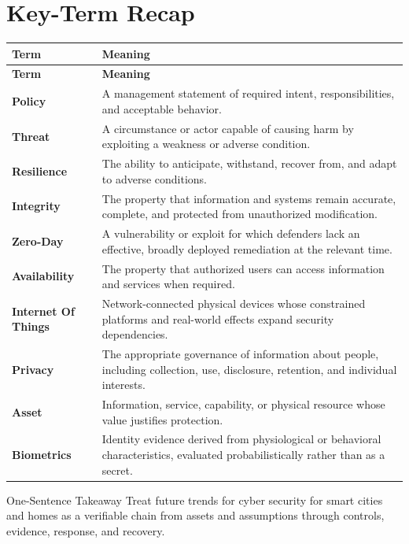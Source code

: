 \documentclass[11pt,letterpaper]{article}
\begin{document}
\section*{Key-Term Recap}
\begin{longtable}{>{\raggedright\arraybackslash}p{}>{\raggedright\arraybackslash}p{}}
\toprule\rowcolor{Navy}\color{white}\textbf{Term} & \color{white}\textbf{Meaning}\\\midrule
\endfirsthead
\toprule\rowcolor{Navy}\color{white}\textbf{Term} & \color{white}\textbf{Meaning}\\\midrule
\endhead
\textbf{Policy} & A management statement of required intent, responsibilities, and acceptable behavior. \\\midrule
\textbf{Threat} & A circumstance or actor capable of causing harm by exploiting a weakness or adverse condition. \\\midrule
\textbf{Resilience} & The ability to anticipate, withstand, recover from, and adapt to adverse conditions. \\\midrule
\textbf{Integrity} & The property that information and systems remain accurate, complete, and protected from unauthorized modification. \\\midrule
\textbf{Zero-Day} & A vulnerability or exploit for which defenders lack an effective, broadly deployed remediation at the relevant time. \\\midrule
\textbf{Availability} & The property that authorized users can access information and services when required. \\\midrule
\textbf{Internet Of Things} & Network-connected physical devices whose constrained platforms and real-world effects expand security dependencies. \\\midrule
\textbf{Privacy} & The appropriate governance of information about people, including collection, use, disclosure, retention, and individual interests. \\\midrule
\textbf{Asset} & Information, service, capability, or physical resource whose value justifies protection. \\\midrule
\textbf{Biometrics} & Identity evidence derived from physiological or behavioral characteristics, evaluated probabilistically rather than as a secret. \\\midrule
\bottomrule
\end{longtable}
\begin{CornellExamBox}{One-Sentence Takeaway}
Treat future trends for cyber security for smart cities and homes as a verifiable chain from assets and assumptions through controls, evidence, response, and recovery.
\end{CornellExamBox}
\end{document}
